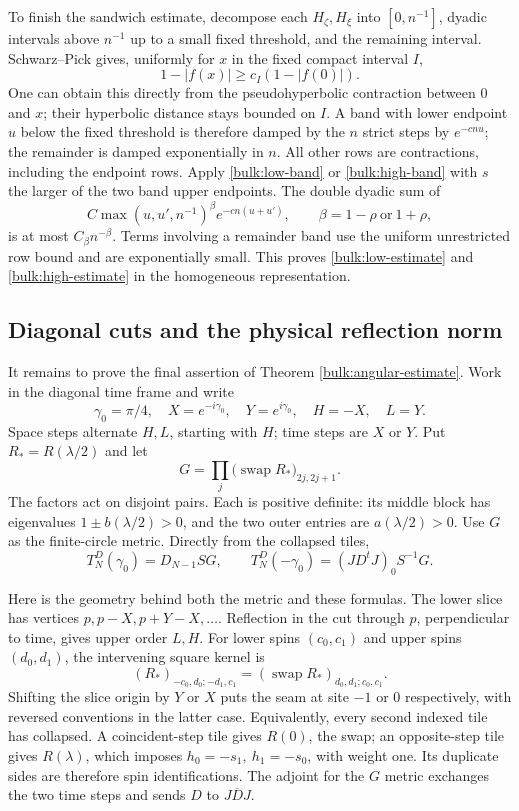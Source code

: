 To finish the sandwich estimate, decompose each $H_\zeta,H_\xi$
into $[0,n^{-1}]$, dyadic intervals above $n^{-1}$ up to a small
fixed threshold, and the remaining interval. Schwarz--Pick gives,
uniformly for $x$ in the fixed compact interval $I$,
\[
 1-|f(x)|\ge c_I(1-|f(0)|).
\]
One can obtain this directly from the pseudohyperbolic contraction
between $0$ and $x$; their hyperbolic distance stays bounded on
$I$. A band with lower endpoint $u$ below the fixed threshold is
therefore damped by the $n$ strict steps by $e^{-cnu}$; the
remainder is damped exponentially in $n$. All other rows are
contractions, including the endpoint rows. Apply
\eqref{bulk:low-band} or \eqref{bulk:high-band} with $s$ the larger
of the two band upper endpoints. The double dyadic sum of
\[
 C\max(u,u',n^{-1})^\beta e^{-cn(u+u')},
 \qquad \beta=1-\rho\ \text{or}\ 1+\rho,
\]
is at most $C_\beta n^{-\beta}$. Terms involving a remainder band
use the uniform unrestricted row bound and are exponentially
small. This proves \eqref{bulk:low-estimate} and
\eqref{bulk:high-estimate} in the homogeneous representation.

\subsection{Diagonal cuts and the physical reflection norm}

It remains to prove the final assertion of Theorem
\ref{bulk:angular-estimate}. Work in the diagonal time frame and
write
\[
 \gamma_0=\pi/4,\quad X=e^{-i\gamma_0},\quad
 Y=e^{i\gamma_0},\quad H=-X,\quad L=Y.
\]
Space steps alternate $H,L$, starting with $H$; time steps are
$X$ or $Y$. Put $R_*=R(\lambda/2)$ and let
\begin{equation}\label{bulk:G}
 G=\prod_j\bigl(\operatorname{swap}R_*\bigr)_{2j,2j+1}.
\end{equation}
The factors act on disjoint pairs. Each is positive definite:
its middle block has eigenvalues $1\pm b(\lambda/2)>0$, and the
two outer entries are $a(\lambda/2)>0$. Use $G$ as the
finite-circle metric. Directly from the collapsed tiles,
\begin{equation}\label{bulk:diagonal-rows}
 T_N^D(\gamma_0)=D_{N-1}SG,\qquad
 T_N^D(-\gamma_0)=(JD^tJ)_0S^{-1}G.
\end{equation}

Here is the geometry behind both the metric and these formulas.
The lower slice has vertices $p,p-X,p+Y-X,\ldots$.
Reflection in the cut through $p$, perpendicular to time, gives
upper order $L,H$. For lower spins $(c_0,c_1)$ and upper spins
$(d_0,d_1)$, the intervening square kernel is
\[
 (R_*)_{-c_0,d_0;-d_1,c_1}
 =(\operatorname{swap}R_*)_{d_0,d_1;c_0,c_1}.
\]
Shifting the slice origin by $Y$ or $X$ puts the seam at site $-1$
or $0$ respectively, with reversed conventions in the latter
case. Equivalently, every second indexed tile has collapsed.
A coincident-step tile gives $R(0)$, the swap; an opposite-step
tile gives $R(\lambda)$, which imposes
$h_0=-s_1,\ h_1=-s_0$, with weight one. Its duplicate sides are
therefore spin identifications. The adjoint for the $G$ metric
exchanges the two time steps and sends $D$ to $J\overline D J$.

